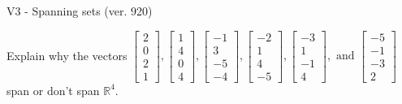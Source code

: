 \begin{exercise}
  \begin{exerciseTitle}V3 - Spanning sets (ver. 920)\end{exerciseTitle}
  \begin{exerciseStatement}
    Explain why the vectors \(\left[\begin{array}{r}
2 \\
0 \\
2 \\
1
\end{array}\right] , \left[\begin{array}{r}
1 \\
4 \\
0 \\
4
\end{array}\right] , \left[\begin{array}{r}
-1 \\
3 \\
-5 \\
-4
\end{array}\right] , \left[\begin{array}{r}
-2 \\
1 \\
4 \\
-5
\end{array}\right] , \left[\begin{array}{r}
-3 \\
1 \\
-1 \\
4
\end{array}\right] , \text{ and } \left[\begin{array}{r}
-5 \\
-1 \\
-3 \\
2
\end{array}\right]\) span or don't span \(\mathbb{R}^4\). 
	



\end{exerciseStatement}
\end{exercise}
